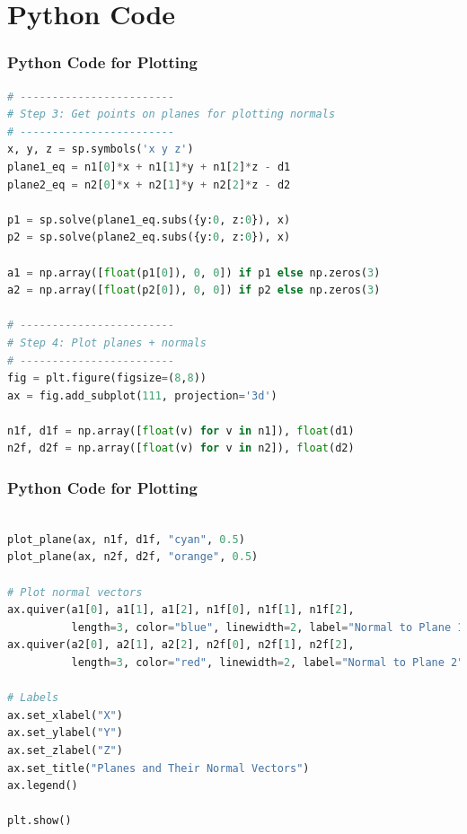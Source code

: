 \documentclass{beamer}
\begin{document}
\section{Python Code}
\begin{frame}[fragile]
\frametitle{Python Code for Plotting}
\begin{lstlisting}[language=Python]   
# ------------------------
# Step 3: Get points on planes for plotting normals
# ------------------------
x, y, z = sp.symbols('x y z')
plane1_eq = n1[0]*x + n1[1]*y + n1[2]*z - d1
plane2_eq = n2[0]*x + n2[1]*y + n2[2]*z - d2

p1 = sp.solve(plane1_eq.subs({y:0, z:0}), x)
p2 = sp.solve(plane2_eq.subs({y:0, z:0}), x)

a1 = np.array([float(p1[0]), 0, 0]) if p1 else np.zeros(3)
a2 = np.array([float(p2[0]), 0, 0]) if p2 else np.zeros(3)

# ------------------------
# Step 4: Plot planes + normals
# ------------------------
fig = plt.figure(figsize=(8,8))
ax = fig.add_subplot(111, projection='3d')

n1f, d1f = np.array([float(v) for v in n1]), float(d1)
n2f, d2f = np.array([float(v) for v in n2]), float(d2)


\end{lstlisting}

\end{frame}
\begin{frame}[fragile]
\frametitle{Python Code for Plotting}
\begin{lstlisting}[language=Python]   

plot_plane(ax, n1f, d1f, "cyan", 0.5)
plot_plane(ax, n2f, d2f, "orange", 0.5)

# Plot normal vectors
ax.quiver(a1[0], a1[1], a1[2], n1f[0], n1f[1], n1f[2],
          length=3, color="blue", linewidth=2, label="Normal to Plane 1")
ax.quiver(a2[0], a2[1], a2[2], n2f[0], n2f[1], n2f[2],
          length=3, color="red", linewidth=2, label="Normal to Plane 2")

# Labels
ax.set_xlabel("X")
ax.set_ylabel("Y")
ax.set_zlabel("Z")
ax.set_title("Planes and Their Normal Vectors")
ax.legend()

plt.show()

\end{lstlisting}

\end{frame}
\end{document}
